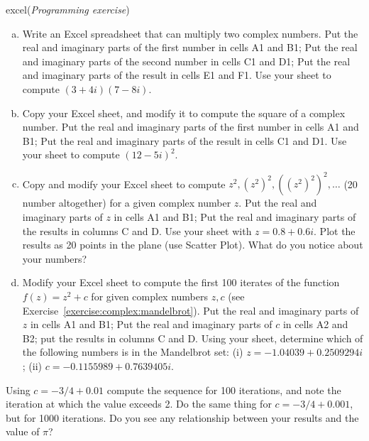\begin{exercise}{excel}(\emph{Programming exercise})
\begin{enumerate}[(a)]
\item
Write an Excel spreadsheet that can multiply two complex numbers. Put the real and imaginary parts of the first number in cells A1 and B1; Put the real and imaginary parts of the second number in cells C1 and D1; Put the real and imaginary parts of the result in cells E1 and F1. Use your sheet to compute $(3 + 4i)(7 - 8i)$.
\item
Copy your Excel sheet, and modify it to compute the square of a complex number. Put the real and imaginary parts of the first number in cells A1 and B1; Put the real and imaginary parts of the result in cells C1 and D1. Use your sheet to compute $(12 - 5i)^2$.
\item 
Copy and modify your Excel sheet to compute $z^2, (z^2)^2,((z^2)^2)^2, \ldots$ (20 number altogether) for a given complex number $z$. Put the real and imaginary parts of $z$ in cells A1 and B1; Put the real and imaginary parts of the results in columns C and D. Use your sheet with $z = 0.8 + 0.6i$. Plot the results as 20 points in the plane (use Scatter Plot). What do you notice about your numbers?
\item
 Modify your Excel sheet to compute the first 100 iterates of the function $f(z) = z^2 + c$ for given complex numbers $z,c$ (see Exercise~\ref{exercise:complex:mandelbrot}). Put the real and imaginary parts of $z$ in cells A1 and B1; Put the real and imaginary parts of $c$ in cells A2 and B2; put the results in columns C and D. Using your sheet, determine which of the following numbers is in the Mandelbrot set: (i) $z = -1.04039 + 0.2509294i$; (ii) $c=-0.1155989 + 0.7639405i$.
\end{enumerate}
\end{exercise} 

\begin{exercise}
Using $c = -3/4 + 0.01$ compute the sequence for 100 iterations, and note the iteration at which the value exceeds 2.  Do the same thing for $c = -3/4 + 0.001$, but for 1000 iterations.  Do you see any relationship between your results and the value of $\pi$?
\end{exercise}